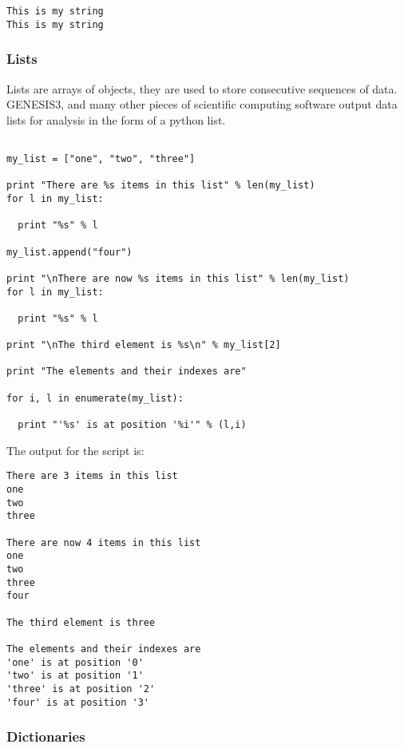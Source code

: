 \documentclass[12pt]{article}
\begin{document}
\begin{verbatim}
This is my string
This is my string
\end{verbatim}

\subsubsection*{Lists}

Lists are arrays of objects, they are used to store consecutive sequences of data. GENESIS3, and many other pieces of scientific computing software output data lists for analysis in the form of a python list.

\begin{verbatim}

my_list = ["one", "two", "three"]

print "There are %s items in this list" % len(my_list)
for l in my_list:

  print "%s" % l

my_list.append("four")

print "\nThere are now %s items in this list" % len(my_list)
for l in my_list:

  print "%s" % l

print "\nThe third element is %s\n" % my_list[2]

print "The elements and their indexes are"

for i, l in enumerate(my_list):

  print "'%s' is at position '%i'" % (l,i)

\end{verbatim}

The output for the script is:

\begin{verbatim}
There are 3 items in this list
one
two
three

There are now 4 items in this list
one
two
three
four

The third element is three

The elements and their indexes are
'one' is at position '0'
'two' is at position '1'
'three' is at position '2'
'four' is at position '3'

\end{verbatim}



\subsubsection*{Dictionaries}
\end{document}
